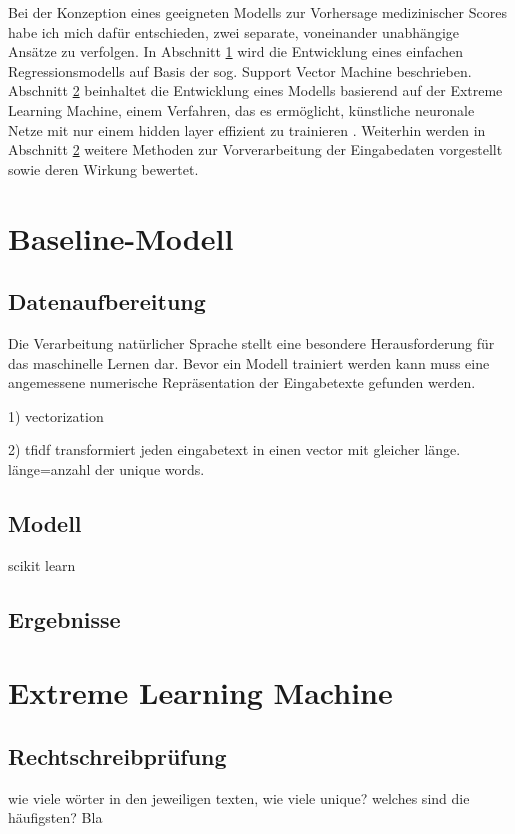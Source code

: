 Bei der Konzeption eines geeigneten Modells zur Vorhersage medizinischer Scores habe ich mich dafür entschieden, zwei separate, voneinander unabhängige Ansätze zu verfolgen. In Abschnitt \ref{section:baseline} wird die Entwicklung eines einfachen Regressionsmodells auf Basis der sog. Support Vector Machine beschrieben. Abschnitt \ref{section:ELM} beinhaltet die Entwicklung eines Modells basierend auf der Extreme Learning Machine, einem Verfahren, das es ermöglicht, künstliche neuronale Netze mit nur einem hidden layer effizient zu trainieren \citep{huangExtremeLearningMachine2006}. Weiterhin werden in Abschnitt \ref{section:ELM} weitere Methoden zur Vorverarbeitung der Eingabedaten vorgestellt sowie deren Wirkung bewertet. 

\section{Baseline-Modell}\label{section:baseline}
\subsection{Datenaufbereitung}
Die Verarbeitung natürlicher Sprache stellt eine besondere Herausforderung für das maschinelle Lernen dar.
Bevor ein Modell trainiert werden kann muss eine angemessene numerische Repräsentation der Eingabetexte gefunden werden. 

1) vectorization

2) tfidf transformiert jeden eingabetext in einen vector mit gleicher länge. länge=anzahl der unique words.
\subsection{Modell}
scikit learn \citep{JMLR:v12:pedregosa11a}
\subsection{Ergebnisse}
\section{Extreme Learning Machine}\label{section:ELM}

\subsection{Rechtschreibprüfung}
wie viele wörter in den jeweiligen texten, wie viele unique? welches sind die häufigsten? Bla

